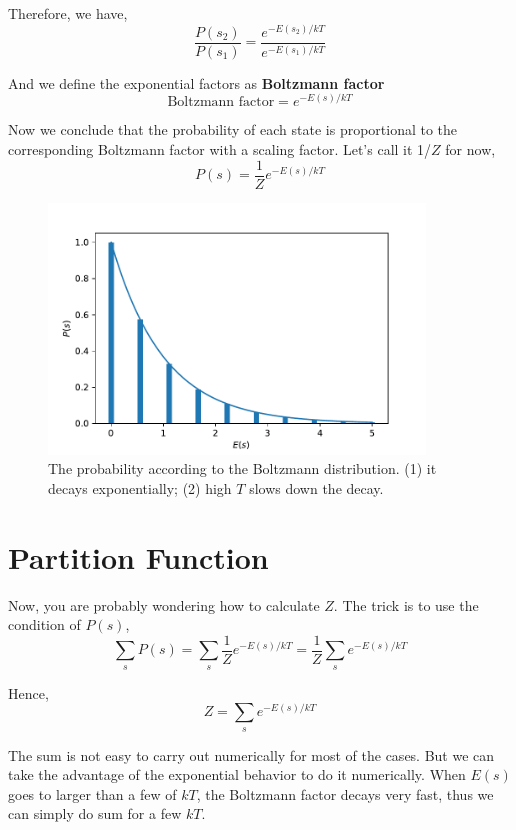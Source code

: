 Therefore, we have,
\begin{equation}
\frac{P(s_2)}{P(s_1)} = \frac{e^{-E(s_2)/kT}}{e^{-E(s_1)/kT}}
\end{equation}

And we define the exponential factors as {\bf Boltzmann factor}
\begin{equation}
\text{Boltzmann factor} = e^{-E(s)/kT}
\end{equation}

Now we conclude that the probability of each state is proportional to the corresponding Boltzmann factor with a scaling factor.
Let's call it 1/$Z$ for now,
\begin{equation}
P(s) = \frac{1}{Z}e^{-E(s)/kT}
\end{equation}


\begin{figure}[h]
\centering
\includegraphics[width=10cm]{imgs/Boltzmann}
\caption{The probability according to the Boltzmann distribution. (1) it decays exponentially; (2) high $T$ slows down the decay. }
\end{figure}



\section{Partition Function}
Now, you are probably wondering how to calculate $Z$. The trick is to use the condition of $P(s)$,
\begin{equation}
\sum_s P(s) = \sum_s \frac{1}{Z} e^{-E(s)/kT} = \frac{1}{Z} \sum_s e^{-E(s)/kT}
\end{equation}

Hence, 
\begin{equation}
Z = \sum_s e^{-E(s)/kT}
\end{equation}

The sum is not easy to carry out numerically for most of the cases. But we can take the advantage of the exponential behavior to do it numerically.
When $E(s)$ goes to larger than a few of $kT$, the Boltzmann factor decays very fast, thus we can simply do sum for a few $kT$.

